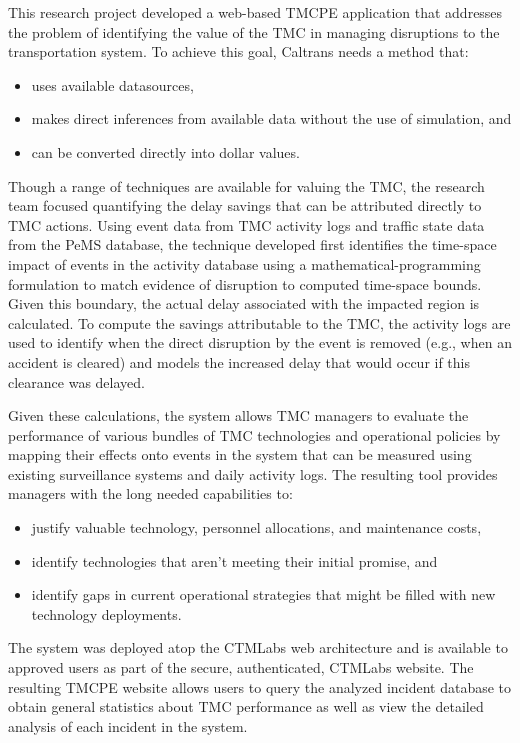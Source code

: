 
This research project developed a web-based \ac{TMCPE} application that
addresses the problem of identifying the value of the \ac{TMC} in managing
disruptions to the transportation system.  To achieve this goal, Caltrans needs
a method that:
\begin{itemize}
\item uses available datasources,
\item makes direct inferences from available data without the use of simulation,
  and
\item can be converted directly into dollar values.
\end{itemize}

Though a range of techniques are available for valuing the \ac{TMC}, the
research team focused quantifying the delay savings that can be attributed
directly to \ac{TMC} actions.  Using event data from \ac{TMC} activity logs and
traffic state data from the \ac{PeMS} database, the technique developed first
identifies the time-space impact of events in the activity database using a
mathematical-programming formulation to match evidence of disruption to computed
time-space bounds.  Given this boundary, the actual delay associated with the
impacted region is calculated.  To compute the savings attributable to the
\ac{TMC}, the activity logs are used to identify when the direct disruption by
the event is removed (e.g., when an accident is cleared) and models the
increased delay that would occur if this clearance was delayed.

Given these calculations, the system allows \ac{TMC} managers to evaluate the
performance of various bundles of \ac{TMC} technologies and operational policies
by mapping their effects onto events in the system that can be measured using
existing surveillance systems and daily activity logs. The resulting tool
provides managers with the long needed capabilities to:
\begin{itemize}
\item justify valuable technology, personnel allocations, and
  maintenance costs,
\item identify technologies that aren't meeting their initial promise,
  and
\item identify gaps in current operational strategies that might be
  filled with new technology deployments.
\end{itemize}

The system was deployed atop the \ac{CTMLabs} web architecture and is available
to approved users as part of the secure, authenticated, \ac{CTMLabs} website.
The resulting \ac{TMCPE} website allows users to query the analyzed incident
database to obtain general statistics about \ac{TMC} performance as well as view
the detailed analysis of each incident in the system.


